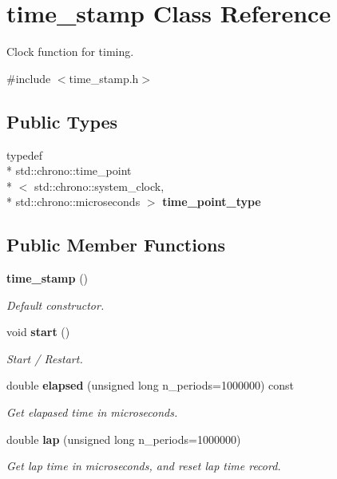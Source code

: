 \section{time\-\_\-stamp Class Reference}
\label{d2/d9d/classtime__stamp}


Clock function for timing.  




{\ttfamily \#include $<$time\-\_\-stamp.\-h$>$}

\subsection*{Public Types}
\begin{DoxyCompactItemize}
\item 
typedef \\*
std\-::chrono\-::time\-\_\-point\\*
$<$ std\-::chrono\-::system\-\_\-clock, \\*
std\-::chrono\-::microseconds $>$ {\bf time\-\_\-point\-\_\-type}
\end{DoxyCompactItemize}
\subsection*{Public Member Functions}
\begin{DoxyCompactItemize}
\item 
{\bf time\-\_\-stamp} ()
\begin{DoxyCompactList}\small\item\em Default constructor. \end{DoxyCompactList}\item 
void {\bf start} ()
\begin{DoxyCompactList}\small\item\em Start / Restart. \end{DoxyCompactList}\item 
double {\bf elapsed} (unsigned long n\-\_\-periods=1000000) const 
\begin{DoxyCompactList}\small\item\em Get elapased time in microseconds. \end{DoxyCompactList}\item 
double {\bf lap} (unsigned long n\-\_\-periods=1000000)
\begin{DoxyCompactList}\small\item\em Get lap time in microseconds, and reset lap time record. \end{DoxyCompactList}\end{DoxyCompactItemize}
